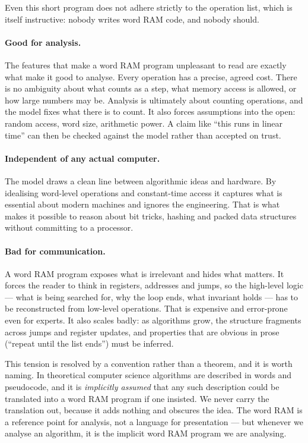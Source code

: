 Even this short program does not adhere strictly to the operation list, which
is itself instructive: nobody writes word RAM code, and nobody should.

\paragraph{Good for analysis.}
The features that make a word RAM program unpleasant to read are exactly what
make it good to analyse. Every operation has a precise, agreed cost. There is
no ambiguity about what counts as a step, what memory access is allowed, or how
large numbers may be. Analysis is ultimately about counting operations, and the
model fixes what there is to count. It also forces assumptions into the open:
random access, word size, arithmetic power. A claim like ``this runs in linear
time'' can then be checked against the model rather than accepted on trust.

\paragraph{Independent of any actual computer.}
The model draws a clean line between algorithmic ideas and hardware. By
idealising word-level operations and constant-time access it captures what is
essential about modern machines and ignores the engineering. That is what makes
it possible to reason about bit tricks, hashing and packed data structures
without committing to a processor.

\paragraph{Bad for communication.}
A word RAM program exposes what is irrelevant and hides what matters. It forces
the reader to think in registers, addresses and jumps, so the high-level logic
--- what is being searched for, why the loop ends, what invariant holds --- has
to be reconstructed from low-level operations. That is expensive and
error-prone even for experts. It also scales badly: as algorithms grow, the
structure fragments across jumps and register updates, and properties that are
obvious in prose (``repeat until the list ends'') must be inferred.

\begin{intuition}
This tension is resolved by a convention rather than a theorem, and it is worth
naming. In theoretical computer science algorithms are described in words and
pseudocode, and it is \emph{implicitly assumed} that any such description could
be translated into a word RAM program if one insisted. We never carry the
translation out, because it adds nothing and obscures the idea. The word RAM is
a reference point for analysis, not a language for presentation --- but
whenever we analyse an algorithm, it is the implicit word RAM program we are
analysing.
\end{intuition}

